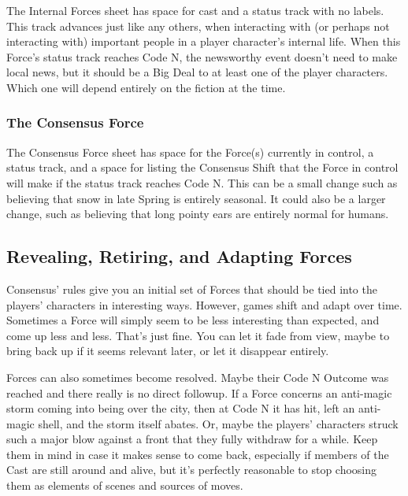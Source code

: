 \documentclass[
]{article}
\begin{document}
The Internal Forces sheet has space for cast and a status track with no
labels. This track advances just like any others, when interacting with
(or perhaps not interacting with) important people in a player
character's internal life. When this Force's status track reaches Code
N, the newsworthy event doesn't need to make local news, but it should
be a Big Deal to at least one of the player characters. Which one will
depend entirely on the fiction at the time.

\hypertarget{the-consensus-force}{%
\subsubsection{The Consensus Force}\label{the-consensus-force}}

The Consensus Force sheet has space for the Force(s) currently in
control, a status track, and a space for listing the Consensus Shift
that the Force in control will make if the status track reaches Code N.
This can be a small change such as believing that snow in late Spring is
entirely seasonal. It could also be a larger change, such as believing
that long pointy ears are entirely normal for humans.

\hypertarget{revealing-retiring-and-adapting-forces}{%
\subsection{Revealing, Retiring, and Adapting
Forces}\label{revealing-retiring-and-adapting-forces}}

Consensus' rules give you an initial set of Forces that should be tied
into the players' characters in interesting ways. However, games shift
and adapt over time. Sometimes a Force will simply seem to be less
interesting than expected, and come up less and less. That's just fine.
You can let it fade from view, maybe to bring back up if it seems
relevant later, or let it disappear entirely.

Forces can also sometimes become resolved. Maybe their Code N Outcome
was reached and there really is no direct followup. If a Force concerns
an anti-magic storm coming into being over the city, then at Code N it
has hit, left an anti-magic shell, and the storm itself abates. Or,
maybe the players' characters struck such a major blow against a front
that they fully withdraw for a while. Keep them in mind in case it makes
sense to come back, especially if members of the Cast are still around
and alive, but it's perfectly reasonable to stop choosing them as
elements of scenes and sources of moves.
\end{document}
